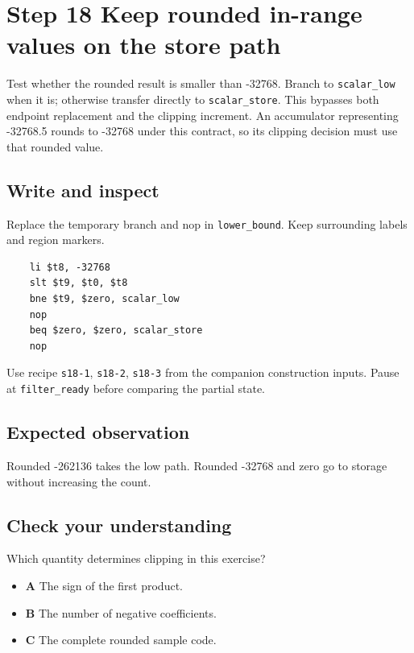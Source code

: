\section{Step 18 Keep rounded in-range values on the store path}\label{fir-s18}

Test whether the rounded result is smaller than -32768. Branch to \texttt{scalar\_low} when it is; otherwise transfer directly to \texttt{scalar\_store}. This bypasses both endpoint replacement and the clipping increment. An accumulator representing -32768.5 rounds to -32768 under this contract, so its clipping decision must use that rounded value.

\subsection{Write and inspect}
Replace the temporary branch and nop in \texttt{lower\_bound}. Keep surrounding labels and region markers.

\begin{verbatim}
    li $t8, -32768
    slt $t9, $t0, $t8
    bne $t9, $zero, scalar_low
    nop
    beq $zero, $zero, scalar_store
    nop
\end{verbatim}
Use recipe \texttt{s18-1}, \texttt{s18-2}, \texttt{s18-3} from the companion construction inputs. Pause at \texttt{filter\_ready} before comparing the partial state.

\subsection{Expected observation}
Rounded -262136 takes the low path. Rounded -32768 and zero go to storage without increasing the count.

\subsection{Check your understanding}
Which quantity determines clipping in this exercise?

\begin{itemize}
\item \textbf{A} The sign of the first product.
\item \textbf{B} The number of negative coefficients.
\item \textbf{C} The complete rounded sample code.
\end{itemize}
